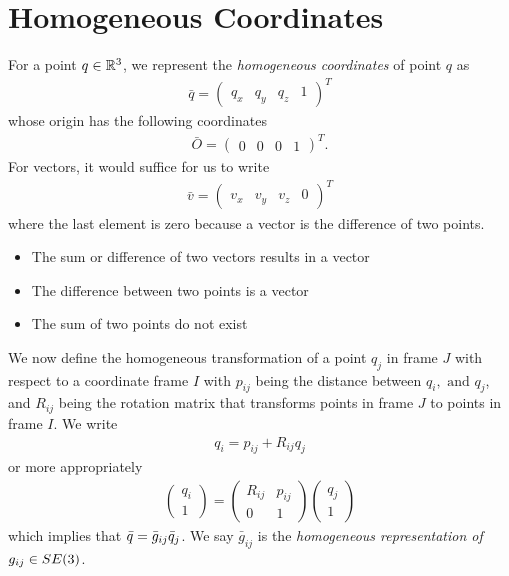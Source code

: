 \section{Homogeneous Coordinates}
%
For a point $q \in \mathbb{R}^3$, we represent the \textit{homogeneous coordinates} of point $q$ as 
%
\begin{align}
	\bar{q} = \left(\begin{array}{cccc}
	q_x &  q_y & q_z & 1
	\end{array}\right)^T
\end{align}
%
whose origin has the following coordinates
%
\begin{align}
\bar{O} = \left(\begin{array}{cccc}
0 &  0 & 0 & 1
\end{array}\right)^T.
\end{align}
%
For vectors, it would suffice for us to write
%
\begin{align}
	\bar{v} =  \left(\begin{array}{cccc}
	v_x &  v_y & v_z & 0
	\end{array}\right)^T
\end{align}
%
where the last element is zero because a vector is the difference of two points.
%
\begin{tcolorbox}[title=Vectors and Points]
	\begin{itemize}
		\item The sum or difference of two vectors results in a vector
		\item The difference between two points is a vector
		\item The sum of two points do not exist
	\end{itemize}
\end{tcolorbox}
%
We now define the homogeneous transformation of a point $q_j$ in frame $J$ with respect to a coordinate frame $I$ with $p_{ij}$ being the distance between $q_i, \text{ and } q_j$,  and $R_{ij}$ being the rotation matrix that transforms points in frame $J$ to points in frame $I$. We write 
%
\begin{align}
	q_i = p_{ij} + R_{ij} q_j
\end{align}
%
or more appropriately
%
\begin{align}
\left(\begin{array}{c}
q_i \\ 1
\end{array}\right) = \left(\begin{array}{cc}
R_{ij} & p_{ij} \\
%
0 & 1
\end{array}\right) \left(\begin{array}{c}
q_j \\ 1
\end{array}\right) 
\end{align} 
%
which implies that $\bar{q} = \bar{g}_{ij} \bar{q}_j$. We say $\bar{g}_{ij}$ is the \textit{homogeneous representation of $g_{ij} \in SE(3)$}. 

